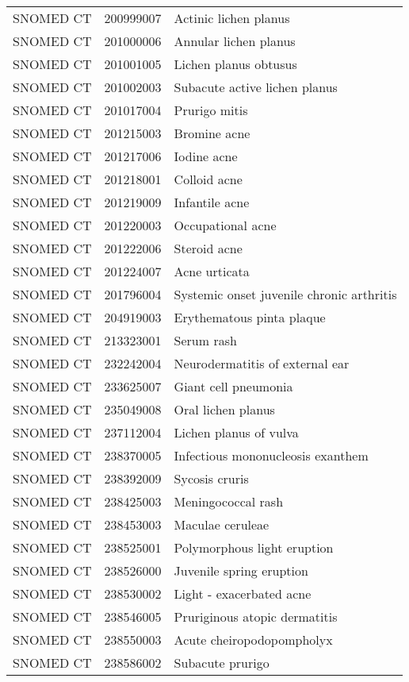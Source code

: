 \begin{longtable}{p{}p{}p{}}
  SNOMED CT & 200999007 & Actinic lichen planus \\ 
  SNOMED CT & 201000006 & Annular lichen planus \\ 
  SNOMED CT & 201001005 & Lichen planus obtusus \\ 
  SNOMED CT & 201002003 & Subacute active lichen planus \\ 
  SNOMED CT & 201017004 & Prurigo mitis \\ 
  SNOMED CT & 201215003 & Bromine acne \\ 
  SNOMED CT & 201217006 & Iodine acne \\ 
  SNOMED CT & 201218001 & Colloid acne \\ 
  SNOMED CT & 201219009 & Infantile acne \\ 
  SNOMED CT & 201220003 & Occupational acne \\ 
  SNOMED CT & 201222006 & Steroid acne \\ 
  SNOMED CT & 201224007 & Acne urticata \\ 
  SNOMED CT & 201796004 & Systemic onset juvenile chronic arthritis \\ 
  SNOMED CT & 204919003 & Erythematous pinta plaque \\ 
  SNOMED CT & 213323001 & Serum rash \\ 
  SNOMED CT & 232242004 & Neurodermatitis of external ear \\ 
  SNOMED CT & 233625007 & Giant cell pneumonia \\ 
  SNOMED CT & 235049008 & Oral lichen planus \\ 
  SNOMED CT & 237112004 & Lichen planus of vulva \\ 
  SNOMED CT & 238370005 & Infectious mononucleosis exanthem \\ 
  SNOMED CT & 238392009 & Sycosis cruris \\ 
  SNOMED CT & 238425003 & Meningococcal rash \\ 
  SNOMED CT & 238453003 & Maculae ceruleae \\ 
  SNOMED CT & 238525001 & Polymorphous light eruption \\ 
  SNOMED CT & 238526000 & Juvenile spring eruption \\ 
  SNOMED CT & 238530002 & Light - exacerbated acne \\ 
  SNOMED CT & 238546005 & Pruriginous atopic dermatitis \\ 
  SNOMED CT & 238550003 & Acute cheiropodopompholyx \\ 
  SNOMED CT & 238586002 & Subacute prurigo \\ 

\end{longtable}
